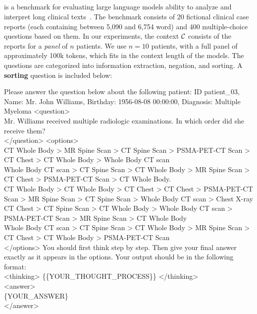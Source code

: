 \subsection{\longhealth}
\longhealth is a benchmark for evaluating large language models ability to analyze and interpret long clinical texts~\cite{adams2024longhealth}. The benchmark consists of 20 fictional clinical case reports (each containing between 5,090 and 6,754 word) and 400 multiple-choice questions based on them.
In our experiments, the context $\mathcal{C}$ consists of the reports for a \textit{panel} of $n$ patients.
We use $n=10$ patients, with a full panel of approximately 100k tokens, which fits in the context length of the \llamathree models.
The questions are categorized into information extraction, negation, and sorting.
A \textbf{sorting} question is included below:
\begin{examplebox}
    \small
    \ttfamily
    Please answer the question below about the following patient: ID patient\_03, Name: Mr. John Williams, Birthday: 1956-08-08 00:00:00, Diagnosis: Multiple Myeloma
    <question>\\
    Mr. Williams received multiple radiologic examinations. In which order did she receive them?\\
    </question>
    <options>\\
    CT Whole Body > MR Spine Scan > CT Spine Scan > PSMA-PET-CT Scan > CT Chest > CT Whole Body > Whole Body CT scan\\
    Whole Body CT scan > CT Spine Scan > CT Whole Body > MR Spine Scan > CT Chest > PSMA-PET-CT Scan > CT Whole Body.\\
    CT Whole Body > CT Whole Body > CT Chest > CT Chest > PSMA-PET-CT Scan > MR Spine Scan > CT Spine Scan > Whole Body CT scan > Chest X-ray\\
    CT Chest > CT Spine Scan > CT Whole Body > Whole Body CT scan > PSMA-PET-CT Scan > MR Spine Scan > CT Whole Body\\
    Whole Body CT scan > CT Spine Scan > CT Whole Body > MR Spine Scan > CT Chest  > CT Whole Body  > PSMA-PET-CT Scan\\
    </options>
    You should first think step by step. Then give your final answer exactly as it appears in the options. Your output should be in the following format:\\
    <thinking> \{\{YOUR\_THOUGHT\_PROCESS\}\} </thinking>\\
    <answer>\\
    \{YOUR\_ANSWER\}\\
    </answer>
\end{examplebox}
